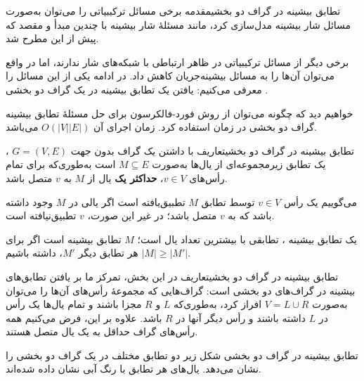 \begin{itemframe-s}{تطابق بیشینه در گراف دو بخشی}{مقدمه}
\itm
برخی مسائل ترکیبیاتی را می‌توان به‌صورت مسائل شار بیشینه‌ مدل‌سازی کرد، مانند مسئلهٔ شار بیشینه با چندین مبدأ و مقصد که پیش از این مطرح شد.

\itm
برخی دیگر از مسائل ترکیبیاتی در ظاهر ارتباطی با شبکه‌های شار ندارند، اما در واقع می‌توان آن‌ها را به مسائل بیشینه‌جریان کاهش داد. در ادامه یکی از این مسائل را معرفی می‌کنیم:
 یافتن یک تطابق بیشینه در یک گراف دو بخشی
 .

\itm
خواهیم دید که چگونه می‌توان از روش فورد-فالکرسون برای حل مسئلهٔ تطابق بیشینه گراف دو بخشی
 در زمان استفاده کرد. زمان اجرای آن $O(|V||E|)$ می‌باشد.
\end{itemframe-s}

\begin{itemframe-s}{تطابق بیشینه در گراف دو بخشی}{تعاریف}
\itm
با داشتن یک گراف بدون جهت
$G = (V, E)$
، یک تطابق
 زیرمجموعه‌ای از یال‌ها به‌صورت
$M \subseteq E$
 است به‌طوری‌که برای تمام رأس‌های
$v \in V$،
 \textbf{حداکثر یک}
 یال از $M$ به $v$ متصل باشد.
\itm

می‌گوییم یک رأس $v \in V$ توسط تطابق $M$ تطبیق‌یافته
است اگر یالی در $M$ وجود داشته باشد که به $v$ متصل باشد؛ در غیر این صورت، $v$ تطبیق‌نیافته
 است.

\itm
یک تطابق بیشینه
، تطابقی با بیشترین تعداد یال است؛ $M$ تطابق بیشینه است اگر برای هر تطابق دیگر $M'$، داشته باشیم
$|M| \geq |M'|$.

\end{itemframe-s}

\begin{itemframe-s}{تطابق بیشینه در گراف دو بخشی}{تعاریف}
\itm
در این بخش، تمرکز ما بر یافتن تطابق‌های بیشینه در گراف‌های دو بخشی
 است: گراف‌هایی که مجموعهٔ رأس‌های آن‌ها را می‌توان به‌صورت
$V = L \cup R$
افراز کرد، به‌طوری‌که $L$ و $R$ مجزا باشند و تمام یال‌ها یک رأس در $L$ داشته باشند و رأس دیگر آنها در $R$ باشد.
\itm
علاوه بر این، فرض می‌کنیم همه رأس‌های گراف حداقل به یک یال متصل هستند.
\end{itemframe-s}

\begin{itemframe}{تطابق بیشینه در گراف دو بخشی}
\itm
شکل زیر دو تطابق مختلف در یک گراف دو بخشی را نشان می‌دهد. یال‌های هر تطابق با رنگ آبی نشان داده شده‌اند.

\end{itemframe}


